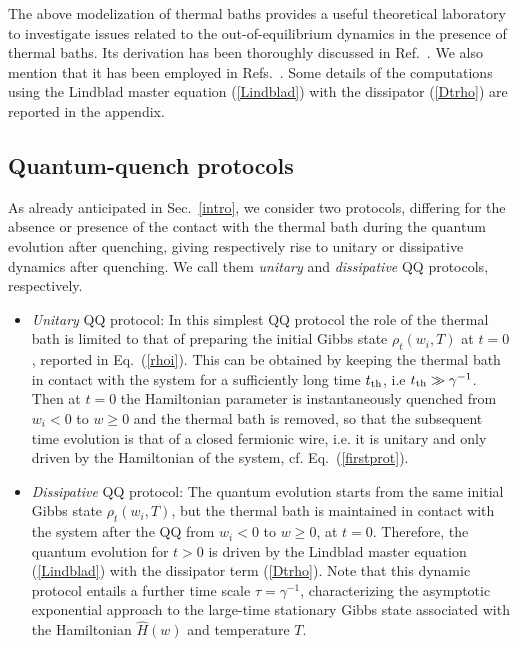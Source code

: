 The above modelization of thermal baths provides a useful theoretical
laboratory to investigate issues related to the out-of-equilibrium
dynamics in the presence of thermal baths. Its derivation has
been thoroughly discussed in Ref.~\cite{DR-21}. We also mention that it
has been employed in Refs.~\cite{PCR-22,BD-23}.  Some details of the
computations using the Lindblad master equation (\ref{Lindblad}) with
the dissipator (\ref{Dtrho}) are reported in the appendix.


\subsection{Quantum-quench protocols}
\label{proto}

As already anticipated in Sec.~\ref{intro}, we consider two protocols,
differing for the absence or presence of the contact with the thermal
bath during the quantum evolution after quenching, giving respectively
rise to unitary or dissipative dynamics after quenching. We call them
{\em unitary} and {\em dissipative} QQ protocols, respectively.

\begin{itemize}

\item {\em Unitary} QQ protocol: In this simplest QQ protocol the role
  of the thermal bath is limited to that of preparing the initial
  Gibbs state $\rho_t(w_i,T)$ at $t=0$, reported in
  Eq.~(\ref{rhoi}). This can be obtained by keeping the thermal bath
  in contact with the system for a sufficiently long time $t_{\rm th}$, i.e
  $t_{\rm th}\gg \gamma^{-1}$. Then at $t=0$ the Hamiltonian parameter is
  instantaneously quenched from $w_i<0$ to $w\ge 0$ and the thermal
  bath is removed, so that the subsequent time evolution is that of a
  closed fermionic wire, i.e.  it is unitary and only driven by the
  Hamiltonian of the system, cf. Eq.~(\ref{firstprot}).

\item {\em Dissipative} QQ protocol: The quantum evolution starts from
  the same initial Gibbs state $\rho_t(w_i,T)$, but the thermal bath
  is maintained in contact with the system after the QQ from $w_i<0$
  to $w\ge 0$, at $t=0$.  Therefore, the quantum evolution for $t>0$
  is driven by the Lindblad master equation (\ref{Lindblad}) with the
  dissipator term (\ref{Dtrho}). Note that this dynamic protocol
  entails a further time scale $\tau = \gamma^{-1}$, characterizing
  the asymptotic exponential approach to the large-time stationary
  Gibbs state associated with the Hamiltonian $\hat{H}(w)$ and
  temperature $T$.

\end{itemize}


